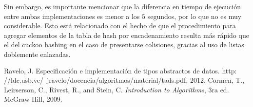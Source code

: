 \documentclass[titlepage]{article}
\begin{document}
	Sin embargo, es importante mencionar que la diferencia en tiempo de ejecuci\'on entre ambas implementaciones es menor a los $5$ segundos, por lo que no es muy considerable. Esto est\'a relacionado con el hecho de que el procedimiento para agregar elementos de la tabla de hash por encadenamiento resulta m\'as r\'apido que el del cuckoo hashing en el caso de presentarse colisiones, gracias al uso de listas doblemente enlazadas.
	
	\begin{thebibliography}{}
		 Ravelo, J. Especificación e implementación de tipos abstractos de datos. http:
		//ldc.usb.ve/~jravelo/docencia/algoritmos/material/tads.pdf, 2012.
		 Cormen, T., Leirserson, C., Rivest, R., and Stein, C. \textit{Introduction to Algorithms}, 3ra ed. McGraw Hill, 2009.

	\end{thebibliography}
	
\end{document}
